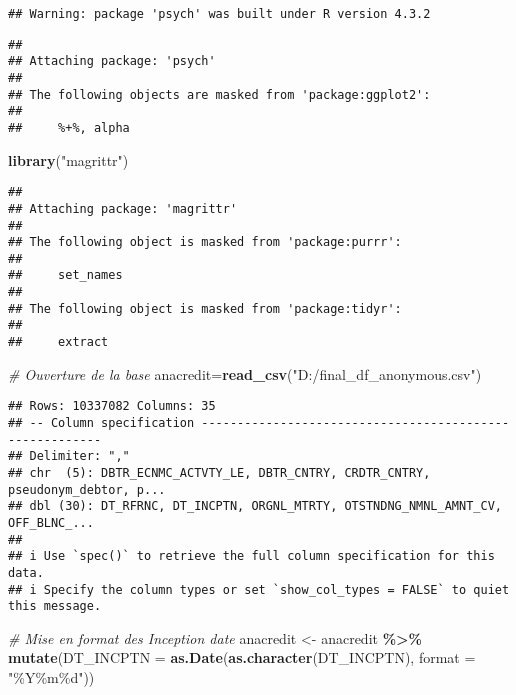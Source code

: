 \documentclass[
]{article}
\newenvironment{Shaded}{\begin{snugshade}}{\end{snugshade}}
\newcommand{\AttributeTok}[1]{\textcolor[rgb]{0.13,0.29,0.53}{#1}}
\newcommand{\CommentTok}[1]{\textcolor[rgb]{0.56,0.35,0.01}{\textit{#1}}}
\newcommand{\FunctionTok}[1]{\textcolor[rgb]{0.13,0.29,0.53}{\textbf{#1}}}
\newcommand{\NormalTok}[1]{#1}
\newcommand{\OtherTok}[1]{\textcolor[rgb]{0.56,0.35,0.01}{#1}}
\newcommand{\SpecialCharTok}[1]{\textcolor[rgb]{0.81,0.36,0.00}{\textbf{#1}}}
\newcommand{\StringTok}[1]{\textcolor[rgb]{0.31,0.60,0.02}{#1}}
\begin{document}
\begin{verbatim}
## Warning: package 'psych' was built under R version 4.3.2
\end{verbatim}

\begin{verbatim}
## 
## Attaching package: 'psych'
## 
## The following objects are masked from 'package:ggplot2':
## 
##     %+%, alpha
\end{verbatim}

\begin{Shaded}
\begin{Highlighting}[]
\FunctionTok{library}\NormalTok{(}\StringTok{"magrittr"}\NormalTok{)}
\end{Highlighting}
\end{Shaded}

\begin{verbatim}
## 
## Attaching package: 'magrittr'
## 
## The following object is masked from 'package:purrr':
## 
##     set_names
## 
## The following object is masked from 'package:tidyr':
## 
##     extract
\end{verbatim}

\begin{Shaded}
\begin{Highlighting}[]
\CommentTok{\# Ouverture de la base }
\NormalTok{anacredit}\OtherTok{=}\FunctionTok{read\_csv}\NormalTok{(}\StringTok{"D:/final\_df\_anonymous.csv"}\NormalTok{)}
\end{Highlighting}
\end{Shaded}

\begin{verbatim}
## Rows: 10337082 Columns: 35
## -- Column specification --------------------------------------------------------
## Delimiter: ","
## chr  (5): DBTR_ECNMC_ACTVTY_LE, DBTR_CNTRY, CRDTR_CNTRY, pseudonym_debtor, p...
## dbl (30): DT_RFRNC, DT_INCPTN, ORGNL_MTRTY, OTSTNDNG_NMNL_AMNT_CV, OFF_BLNC_...
## 
## i Use `spec()` to retrieve the full column specification for this data.
## i Specify the column types or set `show_col_types = FALSE` to quiet this message.
\end{verbatim}

\begin{Shaded}
\begin{Highlighting}[]
\CommentTok{\# Mise en format des Inception date}
\NormalTok{anacredit }\OtherTok{\textless{}{-}}\NormalTok{ anacredit }\SpecialCharTok{\%\textgreater{}\%}
  \FunctionTok{mutate}\NormalTok{(}\AttributeTok{DT\_INCPTN =} \FunctionTok{as.Date}\NormalTok{(}\FunctionTok{as.character}\NormalTok{(DT\_INCPTN), }\AttributeTok{format =} \StringTok{"\%Y\%m\%d"}\NormalTok{))}
\end{Highlighting}
\end{Shaded}
\end{document}
